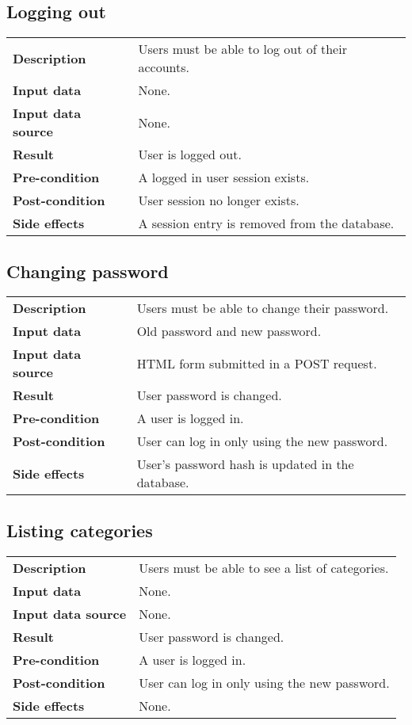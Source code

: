 \subsection{Logging out}

\begin{tabular}{ l l }
	\textbf{Description} & Users must be able to log out of their accounts.\\
	\textbf{Input data} & None.\\
	\textbf{Input data source} & None.\\
	\textbf{Result} & User is logged out.\\
	\textbf{Pre-condition} & A logged in user session exists.\\
	\textbf{Post-condition} & User session no longer exists.\\
	\textbf{Side effects} & A session entry is removed from the database.
\end{tabular}

\subsection{Changing password}

\begin{tabular}{ l l }
	\textbf{Description} & Users must be able to change their password.\\
	\textbf{Input data} & Old password and new password.\\
	\textbf{Input data source} & HTML form submitted in a POST request.\\
	\textbf{Result} & User password is changed.\\
	\textbf{Pre-condition} & A user is logged in.\\
	\textbf{Post-condition} & User can log in only using the new password.\\
	\textbf{Side effects} & User's password hash is updated in the database.
\end{tabular}

\subsection{Listing categories}

\begin{tabular}{ l l }
	\textbf{Description} & Users must be able to see a list of categories.\\
	\textbf{Input data} & None.\\
	\textbf{Input data source} & None.\\
	\textbf{Result} & User password is changed.\\
	\textbf{Pre-condition} & A user is logged in.\\
	\textbf{Post-condition} & User can log in only using the new password.\\
	\textbf{Side effects} & None.
\end{tabular}

